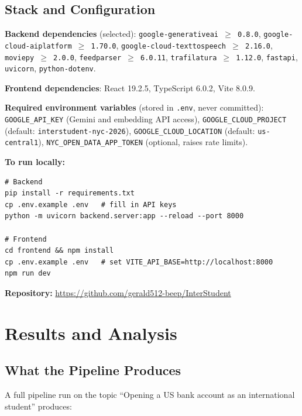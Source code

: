 \documentclass[12pt, letterpaper]{article}
\begin{document}
\subsection{Stack and Configuration}

\textbf{Backend dependencies} (selected): \texttt{google-generativeai $\geq$ 0.8.0},
\texttt{google-cloud-aiplatform $\geq$ 1.70.0}, \texttt{google-cloud-texttospeech
$\geq$ 2.16.0}, \texttt{moviepy $\geq$ 2.0.0}, \texttt{feedparser $\geq$ 6.0.11},
\texttt{trafilatura $\geq$ 1.12.0}, \texttt{fastapi}, \texttt{uvicorn},
\texttt{python-dotenv}.

\textbf{Frontend dependencies}: React 19.2.5, TypeScript 6.0.2, Vite 8.0.9.

\textbf{Required environment variables} (stored in \texttt{.env}, never committed):
\texttt{GOOGLE\_API\_KEY} (Gemini and embedding API access),
\texttt{GOOGLE\_CLOUD\_PROJECT} (default: \texttt{interstudent-nyc-2026}),
\texttt{GOOGLE\_CLOUD\_LOCATION} (default: \texttt{us-central1}),
\texttt{NYC\_OPEN\_DATA\_APP\_TOKEN} (optional, raises rate limits).

\textbf{To run locally:}
\begin{lstlisting}
# Backend
pip install -r requirements.txt
cp .env.example .env   # fill in API keys
python -m uvicorn backend.server:app --reload --port 8000

# Frontend
cd frontend && npm install
cp .env.example .env   # set VITE_API_BASE=http://localhost:8000
npm run dev
\end{lstlisting}

\textbf{Repository:} \url{https://github.com/gerald512-beep/InterStudent}

\newpage

\section{Results and Analysis}

\subsection{What the Pipeline Produces}

A full pipeline run on the topic ``Opening a US bank account as an international
student'' produces:
\end{document}
